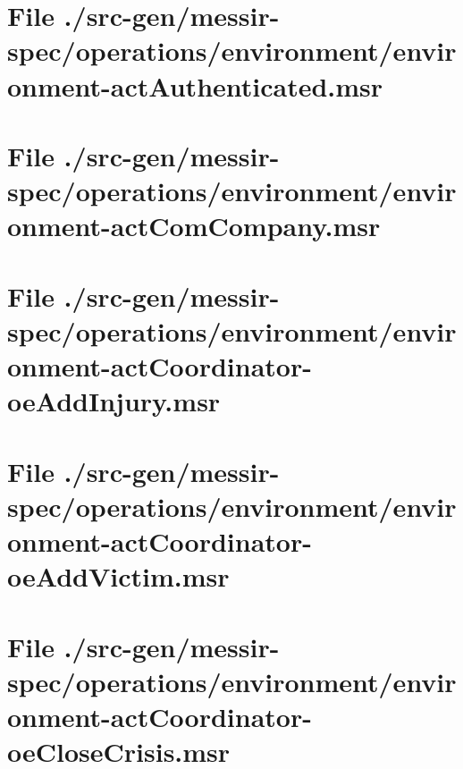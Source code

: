 \section[File /src-gen/messir-spec/operations.../environment-actAuthenticated.msr]{File ./src-gen/messir-spec/operations/environment/environment-actAuthenticated.msr}
\scriptsize

\normalsize
	
\section[File /src-gen/messir-spec/operations/environment/environment-actComCompany.msr]{File ./src-gen/messir-spec/operations/environment/environment-actComCompany.msr}
\scriptsize

\normalsize
	
\section[File /src-gen/messir-spec.../environment-actCoordinator-oeAddInjury.msr]{File ./src-gen/messir-spec/operations/environment/environment-actCoordinator-oeAddInjury.msr}
\scriptsize

\normalsize
	
\section[File /src-gen/messir-spec.../environment-actCoordinator-oeAddVictim.msr]{File ./src-gen/messir-spec/operations/environment/environment-actCoordinator-oeAddVictim.msr}
\scriptsize

\normalsize
	
\section[File /src-gen/messir-spec.../environment-actCoordinator-oeCloseCrisis.msr]{File ./src-gen/messir-spec/operations/environment/environment-actCoordinator-oeCloseCrisis.msr}
\scriptsize

\normalsize
	
